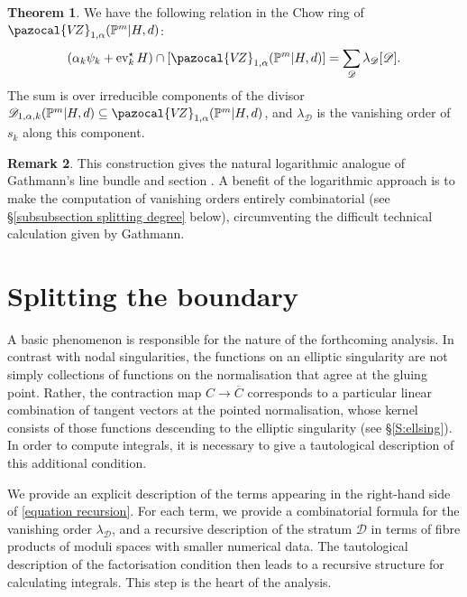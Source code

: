 \documentclass[11pt]{amsart}
\newcommand{\PP}{\mathbb P}
\newcommand{\VZ}{\pazocal{V\!Z}}
\newcommand{\st}{\star}
\renewcommand{\to}{\rightarrow}
\newcommand{\ev}{\operatorname{ev}}
\newcommand{\Dcal}{\mathcal{D}}
\theoremstyle{definition}
\newtheorem{thm}{Theorem}[section]
\theoremstyle{definition}
\newtheorem{remark}[thm]{Remark}
\begin{document}
\begin{thm} \label{theorem recursion} We have the following relation in the Chow ring of $\VZ_{1,\alpha}(\PP^m|H,d)$:
\begin{equation}\label{equation recursion} (\alpha_k \psi_k + \ev_k^\st H) \cap [\VZ_{1,\alpha}(\PP^m|H,d)] = \sum_{\Dcal} \lambda_\Dcal [ \Dcal ].\end{equation}
The sum is over irreducible components of the divisor $\Dcal_{1,\alpha,k}(\PP^m|H,d) \subseteq \VZ_{1,\alpha}(\PP^m|H,d)$, and $\lambda_\Dcal$ is the vanishing order of $s_k$ along this component. \end{thm}

\begin{remark} This construction gives the natural logarithmic analogue of Gathmann's line bundle and section \cite[Construction 2.1]{Ga}. A benefit of the logarithmic approach is to make the computation of vanishing orders entirely combinatorial (see \S \ref{subsubsection splitting degree} below), circumventing the difficult technical calculation given by Gathmann. \end{remark}

\section{Splitting the boundary}\label{section reduced splitting}

\noindent A basic phenomenon is responsible for the nature of the forthcoming analysis. In contrast with nodal singularities, the functions on an elliptic singularity are not simply collections of functions on the normalisation that agree at the gluing point. Rather, the contraction map $C\to\overline C$ corresponds to a particular linear combination of tangent vectors at the pointed normalisation, whose kernel consists of those functions descending to the elliptic singularity (see \S \ref{S:ellsing}). In order to compute integrals, it is necessary to give a tautological description of this additional condition. %

We provide an explicit description of the terms appearing in the right-hand side of \eqref{equation recursion}.  For each term, we provide a combinatorial formula for the vanishing order $\lambda_\Dcal$, and a recursive description of the stratum $\Dcal$ 
in terms of fibre products of moduli spaces with smaller numerical data. The tautological description of the factorisation condition then leads to a recursive structure for calculating integrals. This step is the heart of the analysis. 
\end{document}
